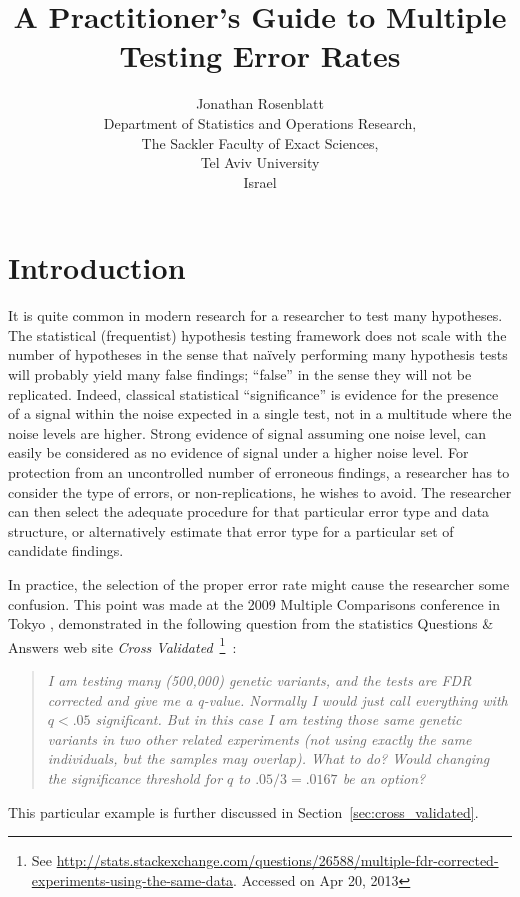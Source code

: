 \documentclass[review,12pt]{article}
\title{A Practitioner's Guide to Multiple Testing Error Rates}
\author{Jonathan Rosenblatt \\
	Department of Statistics and Operations Research,\\
	The Sackler Faculty of Exact Sciences, \\
	Tel Aviv University \\ 
	Israel}
\theoremstyle{definition}
\theoremstyle{definition}
\begin{document}
 \maketitle


\section{\label{sec:introduction}Introduction}

It is quite common in modern research for a researcher to test many hypotheses. 
The statistical (frequentist) hypothesis testing framework does not scale with the number of hypotheses in the sense that na\"{i}vely performing many hypothesis tests will probably yield many false findings;  ``false'' in the sense they will not be replicated.
Indeed, classical statistical ``significance'' is evidence for the presence of a signal within the noise expected in a single test, not in a multitude where the noise levels are higher. 
Strong evidence of signal assuming one noise level, can easily be considered as no evidence of signal under a higher noise level. 
For protection from an uncontrolled number of erroneous findings, a researcher has to consider the type of errors, or non-replications, he wishes to avoid. The researcher can then select the adequate procedure for that particular error type and data structure, or alternatively estimate that error type for a particular set of candidate findings. 

In practice, the selection of the proper error rate might cause the researcher some confusion. This point was made at the 2009 Multiple Comparisons conference in Tokyo \citep[][Section 4.4]{benjamini_simultaneous_2010}, demonstrated in the following question from the statistics Questions \& Answers web site \emph{Cross Validated}~\footnote{ See \url{http://stats.stackexchange.com/questions/26588/multiple-fdr-corrected-experiments-using-the-same-data}. Accessed on Apr 20, 2013}~:
\begin{quotation}\em
I am testing many (500,000) genetic variants, and the tests are FDR corrected and give me a q-value. Normally I would just call everything with $q < .05$ significant. But in this case I am testing those same genetic variants in two other related experiments (not using exactly the same individuals, but the samples may overlap). What to do? Would changing the significance threshold for $q$ to $.05/3=.0167$ be an option?
\end{quotation}
This particular example is further discussed in Section~\ref{sec:cross_validated}. 
\end{document}
